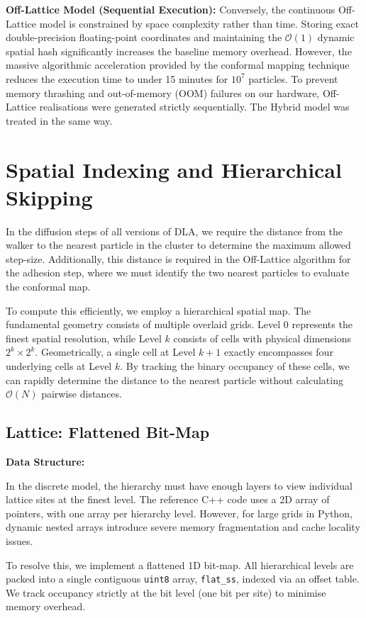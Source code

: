 \documentclass[12pt, a4paper, oneside]{report}
\theoremstyle{remark}
\begin{document}
\noindent \textbf{Off-Lattice Model (Sequential Execution):}
Conversely, the continuous Off-Lattice model is constrained by space complexity rather than time. Storing exact double-precision floating-point coordinates and maintaining the $\mathcal{O}(1)$ dynamic spatial hash significantly increases the baseline memory overhead. However, the massive algorithmic acceleration provided by the conformal mapping technique reduces the execution time to under 15 minutes for $10^7$ particles. To prevent memory thrashing and out-of-memory (OOM) failures on our hardware, Off-Lattice realisations were generated strictly sequentially. The Hybrid model was treated in the same way. 
\section{Spatial Indexing and Hierarchical Skipping}
\label{app:spatial_indexing}

In the diffusion steps of all versions of DLA, we require the distance from the walker to the nearest particle in the cluster to determine the maximum allowed step-size. Additionally, this distance is required in the Off-Lattice algorithm for the adhesion step, where we must identify the two nearest particles to evaluate the conformal map.

To compute this efficiently, we employ a hierarchical spatial map. The fundamental geometry consists of multiple overlaid grids. Level $0$ represents the finest spatial resolution, while Level $k$ consists of cells with physical dimensions $2^k \times 2^k$. Geometrically, a single cell at Level $k+1$ exactly encompasses four underlying cells at Level $k$. By tracking the binary occupancy of these cells, we can rapidly determine the distance to the nearest particle without calculating $\mathcal{O}(N)$ pairwise distances.

\subsection{Lattice: Flattened Bit-Map}
\noindent \textbf{Data Structure:} 

In the discrete model, the hierarchy must have enough layers to view individual lattice sites at the finest level. The reference C++ code uses a 2D array of pointers, with one array per hierarchy level. However, for large grids in Python, dynamic nested arrays introduce severe memory fragmentation and cache locality issues.

To resolve this, we implement a flattened 1D bit-map. All hierarchical levels are packed into a single contiguous \texttt{uint8} array, \texttt{flat\_ss}, indexed via an offset table. We track occupancy strictly at the bit level (one bit per site) to minimise memory overhead.
\end{document}
